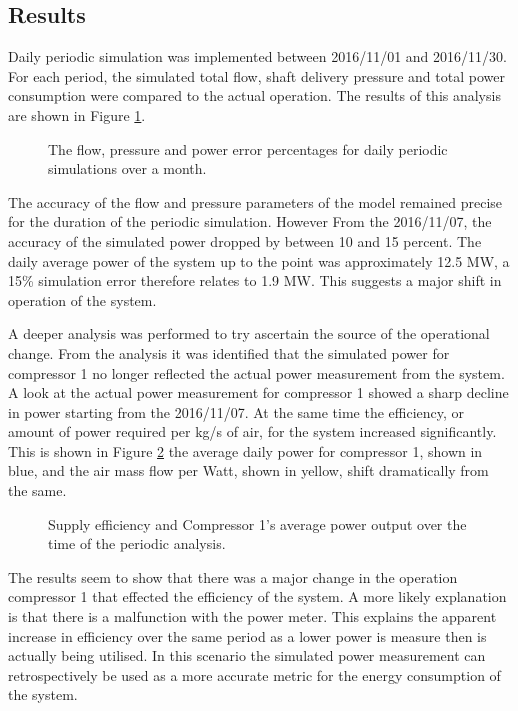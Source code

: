 	     \subsection{Results}
	     Daily periodic simulation was implemented between 2016/11/01 and 2016/11/30. For each period, the simulated total flow, shaft delivery pressure and total power consumption were compared to the actual operation. The results of this analysis are shown in Figure \ref{fig: Periodic simulation}.
	     \par 
	     
	\begin{figure}[h]
		\centering
		\fbox{}
		\caption{The flow, pressure and power error percentages for daily periodic simulations over a month.}
		\label{fig: Periodic simulation}
	\end{figure}   
The accuracy of the flow and pressure parameters of the model remained precise for the duration of the periodic simulation. However From the 2016/11/07, the accuracy of the simulated power dropped by between 10 and 15 percent. The daily average power of the system up to the point was approximately 12.5 MW, a 15\% simulation error therefore relates to 1.9 MW. This suggests a major shift in operation of the system.
\par 
A deeper analysis was performed to try ascertain the source of the operational change. From the analysis it was identified that the simulated power for compressor 1 no longer reflected the actual power measurement from the system. A look at the actual power measurement for compressor 1 showed a sharp decline in power starting from the 2016/11/07. At the same time the efficiency, or amount of power required per kg/s of air, for the system increased significantly. This is shown in Figure \ref{fig: MeasurementAccuracy.} the average daily power for compressor 1, shown in blue, and the air mass flow per Watt, shown in yellow, shift dramatically from the same. 
	\begin{figure}[h]
		\centering
		\fbox{}
		\caption{Supply efficiency and Compressor 1's average power output over the time of the periodic analysis.}
		\label{fig: MeasurementAccuracy.}
	\end{figure} 
   The results seem to show that there was a major change in the operation compressor 1 that effected the efficiency of the system. A more likely explanation is that there is a malfunction with the power meter. This explains the apparent increase in efficiency over the same period as a lower power is measure then is actually being utilised. In this scenario the simulated power measurement can retrospectively be used as a more accurate metric for the energy consumption of the system.  
